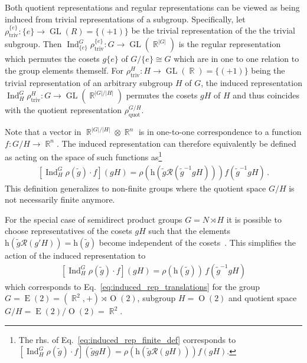 \documentclass{article}
\DeclareMathOperator*{\R}{\mathbb{R}}
\newcommand{\GL}[1]{\ensuremath{\operatorname{GL}(#1)}}
\newcommand{\E}[1]{\ensuremath{\operatorname{E}(#1)}}
\renewcommand{\O}[1]{\ensuremath{\operatorname{O}(#1)}}
\newcommand{\Ind}[2]{\ensuremath{\operatorname{Ind}_{#1}^{#2}}}
\begin{document}
Both quotient representations and regular representations can be viewed as being induced from trivial representations of a subgroup.
Specifically, let $\rho_\text{triv}^{\{e\}}:\{e\}\to\GL{R}=\{(+1)\}$ be the trivial representation of the the trivial subgroup.
Then $\Ind{\{e\}}{G}\rho_\text{triv}^{\{e\}}:G\to\GL{{\R}^{|G|}}$ is the regular representation which permutes the cosets $g\{e\}$ of $G/\{e\}\cong G$ which are in one to one relation to the group elements themself.
For $\rho_\text{triv}^H:H\to\GL{\R}=\{(+1)\}$ being the trivial representation of an arbitrary subgroup $H$ of $G$, the induced representation $\Ind{H}{G}\rho_\text{triv}^H:G\to\GL{{\R}^{|G|/|H|}}$ permutes the cosets $gH$ of $H$ and thus coincides with the quotient representation $\rho_\text{quot}^{G/H}$.

Note that a vector in $\R^{|G|/|H|}\otimes\R^n$ is in one-to-one correspondence to a function $f:G/H\to\R^n$.
The induced representation can therefore equivalently be defined as acting on the space of such functions as\footnote{
    The rhs. of Eq.~\eqref{eq:induced_rep_finite_def} corresponds to
    $[\Ind{H}{G}\rho(\tilde{g}) \cdot f](\tilde{g}gH) = \rho(\text{h}(\tilde{g} \mathcal{R}(gH))) f(gH)$.
}
\begin{align}
\label{eq:induced_field}
    [\Ind{H}{G}\rho(\tilde{g}) \cdot f](gH) = \rho(\text{h}(\tilde{g} \mathcal{R}(\tilde{g}^{-1}gH))) f(\tilde{g}^{-1}gH) \,.
\end{align}
This definition generalizes to non-finite groups where the quotient space $G/H$ is not necessarily finite anymore.

For the special case of semidirect product groups $G=N\rtimes H$ it is possible to choose representatives of the cosets $gH$ such that the elements $\text{h}(\tilde{g}\mathcal{R}(g'H))=\text{h}(\tilde{g})$ become independent of the cosets~\cite{Cohen2018-IIR}.
This simplifies the action of the induced representation to
\begin{align}
\label{eq:induced_field_semidirect}
    [\Ind{H}{G}\rho(\tilde{g}) \cdot f](gH) = \rho(\text{h}(\tilde{g}))\, f(\tilde{g}^{-1}gH)
\end{align}
which corresponds to Eq.~\eqref{eq:induced_rep_translations} for the group $G=\E2=(\R^2,+)\rtimes\O2$, subgroup $H=\O2$ and quotient space $G/H=\E2/\O2=\R^2$.
 	
\end{document}
